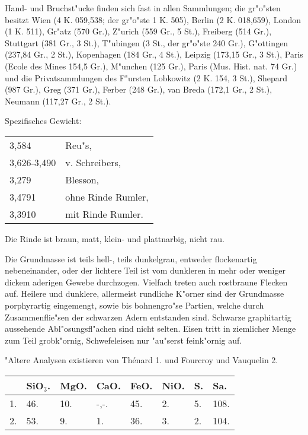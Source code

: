 \documentclass[a4paper, 11pt, oneside]{article}
\begin{document}
Hand- und Bruchst"ucke finden sich fast in allen Sammlungen; die gr"o"sten besitzt Wien (4 K. 059,538; der gr"o"ste 1 K. 505), Berlin (2 K. 018,659), London (1 K. 511), Gr"atz (570 Gr.), Z"urich (559 Gr., 5 St.), Freiberg (514 Gr.), Stuttgart (381 Gr., 3 St.), T"ubingen (3 St., der gr"o"ste 240 Gr.), G"ottingen (237,84 Gr., 2 St.), Kopenhagen (184 Gr., 4 St.), Leipzig (173,15 Gr., 3 St.), Paris (Ecole des Mines 154,5 Gr.), M"unchen (125 Gr.), Paris (Mus. Hist. nat. 74 Gr.) und die Privatsammlungen des F"ursten Lobkowitz (2 K. 154, 3 St.), Shepard (987 Gr.), Greg (371 Gr.), Ferber (248 Gr.), van Breda (172,1 Gr., 2 St.), Neumann (117,27 Gr., 2 St.).

Spezifisches Gewicht:
\begin{table}[!ht]
    \centering\swabfamily\Large
    \begin{tabular}{l l}
        3,584 & Reu"s,\\
        3,626-3,490 & v. Schreibers,\\
        3,279 & Blesson,\\
        3,4791 & ohne Rinde Rumler,\\
        3,3910 & mit Rinde Rumler.
    \end{tabular}
\end{table}

Die Rinde ist braun, matt, klein- und plattnarbig, nicht rau.

Die Grundmasse ist teils hell-, teils dunkelgrau, entweder flockenartig nebeneinander, oder der lichtere Teil ist vom dunkleren in mehr oder weniger dickem aderigen Gewebe durchzogen. Vielfach treten auch rostbraune Flecken auf. Heilere und dunklere, allermeist rundliche K"orner sind der Grundmasse porphyrartig eingemengt, sowie bis bohnengro"se Partien, welche durch Zusammenflie"sen der schwarzen Adern entstanden sind. Schwarze graphitartig aussehende Abl"osungsfl"achen sind nicht selten. Eisen tritt in ziemlicher Menge zum Teil grobk"ornig, Schwefeleisen nur "au"serst feink"ornig auf.

"Altere Analysen existieren von Thénard 1. und Fourcroy und Vauquelin 2.
\begin{table}[!ht]
    \centering\swabfamily\Large
    \begin{tabular}{l l l l l l l l}
         & SiO$_{3}$. & MgO. & CaO. & FeO. & NiO. & S. & Sa. \\ \hline
        1. & 46. & 10. & -,-. & 45. & 2. & 5. & 108. \\
        2. & 53. & 9. & 1. & 36. & 3. & 2. & 104. \\
    \end{tabular}
\end{table}
\end{document}
